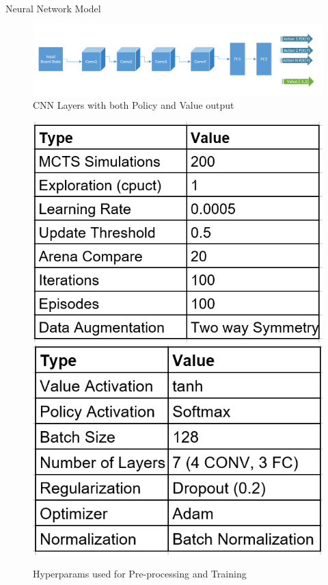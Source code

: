 \documentclass[final]{beamer}
\newlength{\onecolwid}
\newlength{\twocolwid}
\begin{document}
\begin{frame}[t]
\begin{columns}[t]
\begin{column}{\twocolwid}
\begin{columns}[t,totalwidth=\twocolwid]
\begin{column}{\onecolwid}
\begin{column}{\onecolwid}

\begin{block}{Neural Network Model}


\begin{figure}
\includegraphics[width=0.8\linewidth]{cnn.png}
\caption{CNN Layers with both Policy and Value output}
\end{figure}

\begin{figure}
\includegraphics[width=0.4\linewidth]{pre_hyper.png}
\includegraphics[width=0.4\linewidth]{hyper.png}
\caption{Hyperparams used for Pre-processing and Training}
\end{figure}


\end{block}
\end{column}
\end{column}
\end{columns}
\end{column}
\end{columns}
\end{frame}
\end{document}
